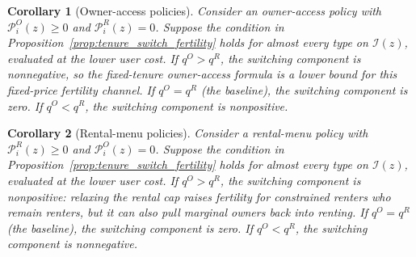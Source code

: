 \documentclass[11pt]{article}
\newtheorem{corollary}{Corollary}
\newcommand{\1}{\mathbf 1}
\begin{document}
\begin{corollary}[Owner-access policies]
\label{cor:switch_owner_access}
Consider an owner-access policy with $\mathcal P_i^O(z)\ge0$ and $\mathcal P_i^R(z)=0$. Suppose the condition in Proposition~\ref{prop:tenure_switch_fertility} holds for almost every type on $\mathcal I(z)$, evaluated at the lower user cost. If $q^O>q^R$, the switching component is nonnegative, so the fixed-tenure owner-access formula is a lower bound for this fixed-price fertility channel. If $q^O=q^R$ (the baseline), the switching component is zero. If $q^O<q^R$, the switching component is nonpositive.
\end{corollary}

\begin{corollary}[Rental-menu policies]
\label{cor:switch_rental_menu}
Consider a rental-menu policy with $\mathcal P_i^R(z)\ge0$ and $\mathcal P_i^O(z)=0$. Suppose the condition in Proposition~\ref{prop:tenure_switch_fertility} holds for almost every type on $\mathcal I(z)$, evaluated at the lower user cost. If $q^O>q^R$, the switching component is nonpositive: relaxing the rental cap raises fertility for constrained renters who remain renters, but it can also pull marginal owners back into renting. If $q^O=q^R$ (the baseline), the switching component is zero. If $q^O<q^R$, the switching component is nonnegative.
\end{corollary}

\clearpage
\end{document}
